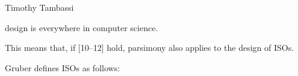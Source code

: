\begin{artengenv}{Timothy Tambassi}
\setcounter{saveenumtambassi}{\value{enumi}}

\begin{enumerate}[label={[\arabic*]}]

\setcounter{enumi}{\value{saveenumtambassi}}

\item design is everywhere in computer science.

\end{enumerate}

This means that, if [10–12] hold, parsimony also applies to the design of ISOs.



Gruber 
\parencite*[][]{liu_ontology_2009} %
 defines ISOs as follows:



\setcounter{saveenumtambassi}{\value{enumi}}

\begin{enumerate}[label={[\arabic*]}]

\setcounter{enumi}{\value{saveenumtambassi}}


\end{enumerate}
\end{artengenv}
